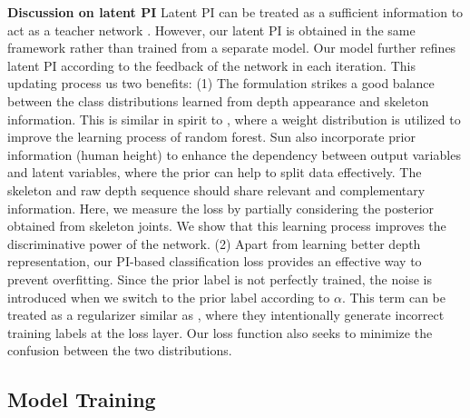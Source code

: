 \documentclass[10pt,twocolumn,letterpaper]{article}
\begin{document}
\noindent \textbf{Discussion on latent PI} Latent PI can be treated as a sufficient information to act as a teacher network \cite{Korattikara_nips_2015,Szegedy_2015}. However, our latent PI is obtained in the same framework rather than trained from a separate model. Our model further refines latent PI according to the feedback of the network in each iteration. 
This updating process us two benefits: (1) The formulation strikes a good balance between the class distributions learned from depth appearance and skeleton information.  This is similar in spirit to \cite{Schulter_cvpr_2013}, where a weight distribution is utilized to improve the learning process of random forest. Sun \etal \cite{Sun_cvpr_2012} also incorporate prior information (\eg human height) to enhance the dependency between output variables and latent variables, where the prior can help to split data effectively. The skeleton and raw depth sequence should share relevant and complementary information.  Here, we measure the loss by partially considering the posterior obtained from skeleton joints. We show that this learning process improves the discriminative power of the network. (2) Apart from learning better depth representation, our PI-based classification loss provides an effective way to prevent overfitting. Since the prior label is not perfectly trained, the noise is introduced when we switch to the prior label according to $\alpha$. This term can be treated as a regularizer similar as \cite{xie2016disturblabel}, where they intentionally generate incorrect training labels at the loss layer. Our loss function also seeks to minimize the confusion between the two distributions.  






\subsection{Model Training}
\end{document}
